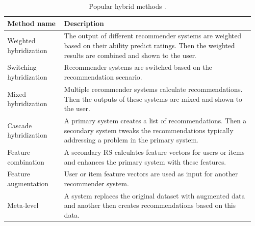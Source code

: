 \begin{table}[h]
\centering
\begin{tabular}{p{4cm}p{8cm}}
\toprule
\textbf{Method name} & \textbf{Description} \\
\midrule
Weighted hybridization & The output of different recommender systems are weighted based on their ability predict ratings. Then the weighted results are combined and shown to the user. \\
Switching hybridization & Recommender systems are switched based on the recommendation scenario. \\
Mixed hybridization & Multiple recommender systems calculate recommendations. Then the outputs of these systems are mixed and shown to the user. \\
Cascade hybridization & A primary system creates a list of recommendations. Then a secondary system tweaks the recommendations typically addressing a problem in the primary system. \\
Feature combination & A secondary RS calculates feature vectors for users or items and enhances the primary system with these features. \\
Feature augmentation & User or item feature vectors are used as input for another recommender system. \\
Meta-level & A system replaces the original dataset with augmented data and another then creates recommendations based on this data. \\
\bottomrule
\end{tabular}
\caption{Popular hybrid methods \parencite{roy2022systematic}.}
\label{tab:hybrid_methods}
\end{table}